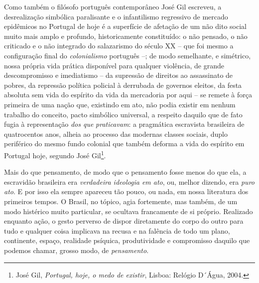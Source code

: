 Como também o filósofo português contemporâneo José Gil escreveu, a
desrealização simbólica paralisante e o infantilismo regressivo de
mercado epidêmicos no Portugal de hoje é a superfície de afetação de um
não dito social muito mais amplo e profundo, historicamente constituído:
o não pensado, o não criticado e o não integrado do salazarismo do
século XX -- que foi mesmo a configuração final do \emph{colonialismo}
português --; de modo semelhante, e simétrico, nossa própria vida
prática disponível para qualquer violência, de grande descompromisso e
imediatismo -- da supressão de direitos ao assassinato de pobres, da
repressão política policial à derrubada de governos eleitos, da festa
absoluta sem vida do espírito da vida da mercadoria por aqui -- se
remete à força primeira de uma nação que, existindo em ato, não podia
existir em nenhum trabalho do conceito, pacto simbólico universal, a
respeito daquilo que de fato fugia à representação \emph{dos que}
\emph{praticavam}: a pragmática escravista brasileira de quatrocentos
anos, alheia ao processo das modernas classes sociais, duplo periférico
do mesmo fundo colonial que também deforma a vida do espírito em
Portugal hoje, segundo José Gil\footnote{José Gil, \emph{Portugal, hoje,
  o medo de existir}, Lisboa: Relógio D´Água, 2004.}.

Mais do que pensamento, de modo que o pensamento fosse menos do que ela,
a escravidão brasileira era \emph{verdadeira ideologia em ato}, ou,
melhor dizendo, era \emph{puro} \emph{ato}. E por isso ela sempre
apareceu tão pouco, ou nada, em nossa literatura dos primeiros tempos. O
Brasil, no tópico, agia fortemente, mas também, de um modo histérico
muito particular, se ocultava francamente de si próprio. Realizado
enquanto ação, o gesto perverso de dispor diretamente do corpo do outro
para tudo e qualquer coisa implicava na recusa e na falência de todo um
plano, continente, espaço, realidade psíquica, produtividade e
compromisso daquilo que podemos chamar, grosso modo, de
\emph{pensamento}.

